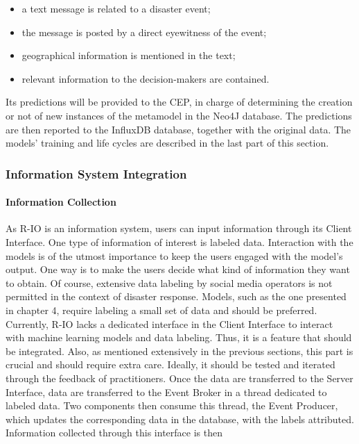 \begin{itemize}
    \item a text message is related to a disaster event;
    \item the message is posted by a direct eyewitness of the event;
    \item geographical information is mentioned in the text;
    \item relevant information to the decision-makers are contained.
\end{itemize}

Its predictions will be provided to the CEP, in charge of determining the creation or not of new instances of the metamodel in the Neo4J database.
The predictions are then reported to the InfluxDB database, together with the original data.
The models' training and life cycles are described in the last part of this section.

\subsubsection{Information System Integration}
\paragraph{Information Collection}
As R-IO is an information system, users can input information through its Client Interface.
One type of information of interest is labeled data.
Interaction with the models is of the utmost importance to keep the users engaged with the model's output.
One way is to make the users decide what kind of information they want to obtain.
Of course, extensive data labeling by social media operators is not permitted in the context of disaster response.
Models, such as the one presented in chapter 4, require labeling a small set of data and should be preferred.
Currently, R-IO lacks a dedicated interface in the Client Interface to interact with machine learning models and data labeling.
Thus, it is a feature that should be integrated.
Also, as mentioned extensively in the previous sections, this part is crucial and should require extra care.
Ideally, it should be tested and iterated through the feedback of practitioners.
Once the data are transferred to the Server Interface, data are transferred to the Event Broker in a thread dedicated to labeled data.
Two components then consume this thread, the Event Producer, which updates the corresponding data in the database, with the labels attributed.
Information collected through this interface is then

